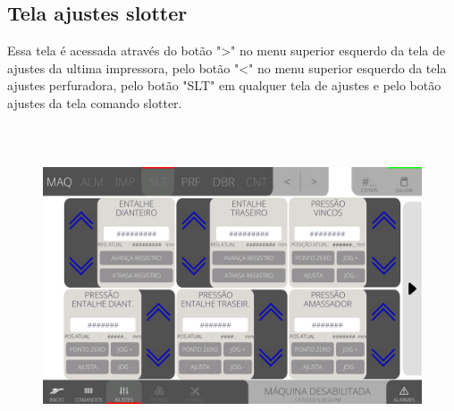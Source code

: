 \thispagestyle{fancy}
\vspace*{40 pt}
\subsection{Tela ajustes slotter}\label{telaAjustesSlotter}
 Essa tela é acessada através do botão "\textgreater" no menu superior esquerdo da tela de ajustes da ultima impressora, pelo botão "\textless{}" no menu superior esquerdo 
 da tela ajustes perfuradora, pelo botão "SLT" em qualquer tela de ajustes e pelo botão ajustes da tela comando slotter.
 \vspace*{\fill}
 \begin{figure}[h]
  \centering
  \includegraphics[width=576px,height=360px]{src/imagesFlexo/05-slotter/settings/e-Tela-Principal.png}
\end{figure}
\vspace*{\fill}

\newpage
\thispagestyle{fancy}
\vspace*{40 pt}
